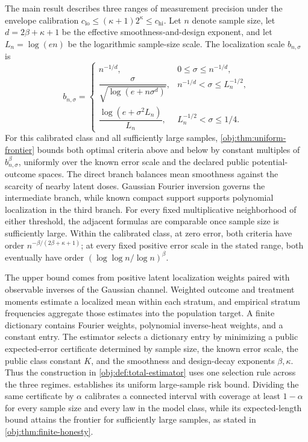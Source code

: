 The main result describes three ranges of measurement precision under the envelope calibration \(c_{\mathrm{lo}}\le(\kappa+1)2^\kappa\le c_{\mathrm{hi}}\). Let \(n\) denote sample size, let \(d=2\beta+\kappa+1\) be the effective smoothness-and-design exponent, and let \(L_n=\log(en)\) be the logarithmic sample-size scale. The localization scale \(b_{n,\sigma}\) is
\[
b_{n,\sigma}=
\begin{cases}
n^{-1/d},
&0\le\sigma\le n^{-1/d},\\[3pt]
\dfrac{\sigma}{\sqrt{\log(e+n\sigma^d)}},
&n^{-1/d}<\sigma\le L_n^{-1/2},\\[7pt]
\dfrac{\log(e+\sigma^2L_n)}{L_n},
&L_n^{-1/2}<\sigma\le1/4.
\end{cases}
\]
For this calibrated class and all sufficiently large samples, \cref{obj:thm:uniform-frontier} bounds both optimal criteria above and below by constant multiples of \(b_{n,\sigma}^{\beta}\), uniformly over the known error scale and the declared public potential-outcome spaces. The direct branch balances mean smoothness against the scarcity of nearby latent doses. Gaussian Fourier inversion governs the intermediate branch, while known compact support supports polynomial localization in the third branch. For every fixed multiplicative neighborhood of either threshold, the adjacent formulas are comparable once sample size is sufficiently large. Within the calibrated class, at zero error, both criteria have order \(n^{-\beta/(2\beta+\kappa+1)}\); at every fixed positive error scale in the stated range, both eventually have order \((\log\log n/\log n)^\beta\).

The upper bound comes from positive latent localization weights paired with observable inverses of the Gaussian channel. Weighted outcome and treatment moments estimate a localized mean within each stratum, and empirical stratum frequencies aggregate those estimates into the population target. A finite dictionary contains Fourier weights, polynomial inverse-heat weights, and a constant entry. The estimator selects a dictionary entry by minimizing a public expected-error certificate determined by sample size, the known error scale, the public class constant \(K\), and the smoothness and design-decay exponents \(\beta,\kappa\). Thus the construction in \cref{obj:def:total-estimator} uses one selection rule across the three regimes.  establishes its uniform large-sample risk bound. Dividing the same certificate by \(\alpha\) calibrates a connected interval with coverage at least \(1-\alpha\) for every sample size and every law in the model class, while its expected-length bound attains the frontier for sufficiently large samples, as stated in \cref{obj:thm:finite-honesty}.

